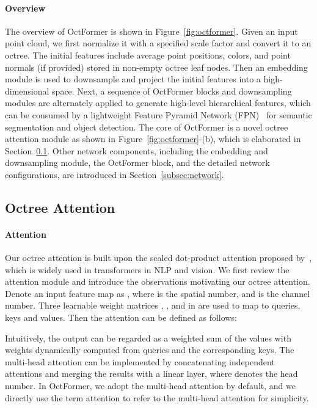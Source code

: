 \documentclass[acmtog,screen,authorversion]{acmart}
\begin{document}
\paragraph{Overview}
The overview of OctFormer is shown in Figure~\ref{fig:octformer}.
Given an input point cloud, we first normalize it with a specified scale factor and convert it to an octree.
The initial features include average point positions, colors, and point normals (if provided) stored in non-empty octree leaf nodes.
Then an embedding module is used to downsample and project the initial features into a high-dimensional space.
Next, a sequence of OctFormer blocks and downsampling modules are alternately applied to generate high-level hierarchical features, which can be consumed by a lightweight Feature Pyramid Network (FPN)~\cite{Lin2017,Kirillov2019} for semantic segmentation and object detection.
The core of OctFormer is a novel octree attention module as shown in Figure~\ref{fig:octformer}-(b), which is elaborated in Section~\ref{subsec:attention}.
Other network components, including the embedding and downsampling module, the OctFormer block, and the detailed network configurations, are introduced in Section~\ref{subsec:network}.


\subsection{Octree Attention} \label{subsec:attention}

\paragraph{Attention}
Our octree attention is built upon the scaled dot-product attention proposed by~\cite{Vaswani2017}, which is widely used in transformers in NLP and vision.
We first review the attention module and introduce the observations motivating our octree attention.
Denote an input feature map as , where  is the spatial number, and  is the channel number.
Three learnable weight matrices , , and  in  are used to map  to queries, keys and values.
Then the attention can be defined as follows:

Intuitively, the output can be regarded as a weighted sum of the values with weights dynamically computed from queries and the corresponding keys.
The multi-head attention can be implemented by concatenating  independent attentions and merging the results with a linear layer, where  denotes the head number.
In OctFormer, we adopt the multi-head attention by default, and we
directly use the term attention to refer to the multi-head attention for simplicity.
\end{document}

